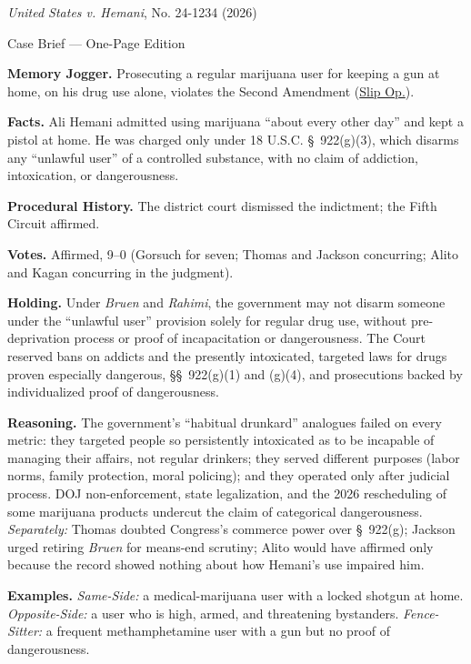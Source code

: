 \documentclass[12pt]{article}
\begin{document}
\begin{center}
{\Large \textit{United States v. Hemani}, No. 24-1234 (2026)\par}
\vspace{0.3em}
{\normalsize Case Brief --- One-Page Edition\par}
\end{center}

\textbf{Memory Jogger.} Prosecuting a regular marijuana user for keeping a gun at home, on his drug use alone, violates the Second Amendment (\href{https://www.supremecourt.gov/opinions/25pdf/24-1234_g2bh.pdf}{Slip Op.}).

\textbf{Facts.} Ali Hemani admitted using marijuana ``about every other day'' and kept a pistol at home. He was charged only under 18 U.S.C. \S~922(g)(3), which disarms any ``unlawful user'' of a controlled substance, with no claim of addiction, intoxication, or dangerousness.

\textbf{Procedural History.} The district court dismissed the indictment; the Fifth Circuit affirmed.

\textbf{Votes.} Affirmed, 9--0 (Gorsuch for seven; Thomas and Jackson concurring; Alito and Kagan concurring in the judgment).

\textbf{Holding.} Under \textit{Bruen} and \textit{Rahimi}, the government may not disarm someone under the ``unlawful user'' provision solely for regular drug use, without pre-deprivation process or proof of incapacitation or dangerousness. The Court reserved bans on addicts and the presently intoxicated, targeted laws for drugs proven especially dangerous, \S\S~922(g)(1) and (g)(4), and prosecutions backed by individualized proof of dangerousness.

\textbf{Reasoning.} The government's ``habitual drunkard'' analogues failed on every metric: they targeted people so persistently intoxicated as to be incapable of managing their affairs, not regular drinkers; they served different purposes (labor norms, family protection, moral policing); and they operated only after judicial process. DOJ non-enforcement, state legalization, and the 2026 rescheduling of some marijuana products undercut the claim of categorical dangerousness. \emph{Separately:} Thomas doubted Congress's commerce power over \S~922(g); Jackson urged retiring \textit{Bruen} for means-end scrutiny; Alito would have affirmed only because the record showed nothing about how Hemani's use impaired him.

\textbf{Examples.} \emph{Same-Side:} a medical-marijuana user with a locked shotgun at home. \emph{Opposite-Side:} a user who is high, armed, and threatening bystanders. \emph{Fence-Sitter:} a frequent methamphetamine user with a gun but no proof of dangerousness.
\end{document}
